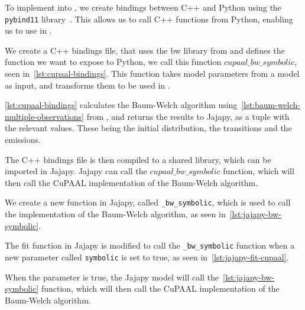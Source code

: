 To implement \Cupaal into \Jajapy, we create bindings between C++ and Python using the \texttt{pybind11} library~\cite{pybind11github}.
This allows us to call C++ functions from Python, enabling us to use \Cupaal in \Jajapy.

We create a C++ bindings file, that uses the \gls{bw} library from \Cupaal and defines the function we want to expose to Python, we call this function $cupaal\_bw\_symbolic$, seen in~\autoref{lst:cupaal-bindings}.
This function takes model parameters from a \Jajapy model as input, and transforms them to be used in \Cupaal.

\autoref{lst:cupaal-bindings} calculates the Baum-Welch algorithm using~\autoref{lst:baum-welch-multiple-observations} from \Cupaal, and returns the results to Jajapy, as a tuple with the relevant values.
These being the initial distribution, the transitions and the emissions.

The C++ bindings file is then compiled to a shared library, which can be imported in Jajapy.
Jajapy can call the $cupaal\_bw\_symbolic$ function, which will then call the CuPAAL implementation of the Baum-Welch algorithm.

We create a new function in Jajapy, called \texttt{\_bw\_symbolic}, which is used to call the \Cupaal implementation of the Baum-Welch algorithm, as seen in~\autoref{lst:jajapy-bw-symbolic}.

The fit function in Jajapy is modified to call the \texttt{\_bw\_symbolic} function when a new parameter called \texttt{symbolic} is set to true, as seen in~\autoref{lst:jajapy-fit-cupaal}.

When the parameter is true, the Jajapy model will call the~\autoref{lst:jajapy-bw-symbolic} function, which will then call the CuPAAL implementation of the Baum-Welch algorithm.


